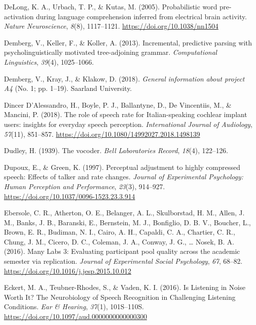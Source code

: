 \documentclass[a4paper, nobind]{templates/ociamthesis}
\newlength{\cslhangindent}
\newenvironment{CSLReferences}[2] %
 {%
  \setlength{\parindent}{0pt}
  \ifodd #1
  \let\oldpar\par
  \def\par{\hangindent=\cslhangindent\oldpar}
  \fi
  \setlength{\parskip}{1mm}
  \setlength{\baselineskip}{6mm}
 }%
 {}
\begin{document}
\begin{CSLReferences}{1}{0}
\leavevmode{}%
DeLong, K. A., Urbach, T. P., \& Kutas, M. (2005). Probabilistic word pre-activation during language comprehension inferred from electrical brain activity. \emph{Nature Neuroscience}, \emph{8}(8), 1117--1121. \url{https://doi.org/10.1038/nn1504}

\leavevmode{}%
Demberg, V., Keller, F., \& Koller, A. (2013). Incremental, predictive parsing with psycholinguistically motivated tree-adjoining grammar. \emph{Computational Linguistics}, \emph{39}(4), 1025--1066.

\leavevmode{}%
Demberg, V., Kray, J., \& Klakow, D. (2018). \emph{{General information about project A4}} (No. 1; pp. 1--19). Saarland University.

\leavevmode{}%
Dincer D'Alessandro, H., Boyle, P. J., Ballantyne, D., De Vincentiis, M., \& Mancini, P. (2018). {The role of speech rate for Italian-speaking cochlear implant users: insights for everyday speech perception}. \emph{International Journal of Audiology}, \emph{57}(11), 851--857. \url{https://doi.org/10.1080/14992027.2018.1498139}

\leavevmode{}%
Dudley, H. (1939). {The vocoder}. \emph{Bell Laboratories Record}, \emph{18}(4), 122--126.

\leavevmode{}%
Dupoux, E., \& Green, K. (1997). Perceptual adjustment to highly compressed speech: Effects of talker and rate changes. \emph{Journal of Experimental Psychology: Human Perception and Performance}, \emph{23}(3), 914--927. \url{https://doi.org/10.1037/0096-1523.23.3.914}

\leavevmode{}%
Ebersole, C. R., Atherton, O. E., Belanger, A. L., Skulborstad, H. M., Allen, J. M., Banks, J. B., Baranski, E., Bernstein, M. J., Bonfiglio, D. B. V., Boucher, L., Brown, E. R., Budiman, N. I., Cairo, A. H., Capaldi, C. A., Chartier, C. R., Chung, J. M., Cicero, D. C., Coleman, J. A., Conway, J. G., \ldots{} Nosek, B. A. (2016). {Many Labs 3: Evaluating participant pool quality across the academic semester via replication}. \emph{Journal of Experimental Social Psychology}, \emph{67}, 68--82. \url{https://doi.org/10.1016/j.jesp.2015.10.012}

\leavevmode{}%
Eckert, M. A., Teubner-Rhodes, S., \& Vaden, K. I. (2016). Is Listening in Noise Worth It? The Neurobiology of Speech Recognition in Challenging Listening Conditions. \emph{Ear \& Hearing}, \emph{37}(1), 101S--110S. \url{https://doi.org/10.1097/aud.0000000000000300}


\end{CSLReferences}
\end{document}
